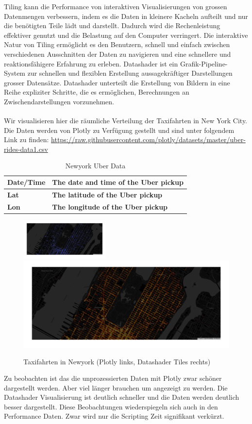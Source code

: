 \documentclass{article}
\begin{document}
Tiling kann die Performance von interaktiven Visualisierungen von grossen Datenmengen verbessern, 
indem es die Daten in kleinere Kacheln aufteilt und nur die benötigten Teile lädt und darstellt. 
Dadurch wird die Rechenleistung effektiver genutzt und die Belastung auf den Computer verringert. 
Die interaktive Natur von Tiling ermöglicht es den Benutzern, schnell und einfach zwischen verschiedenen Ausschnitten der Daten zu navigieren und eine schnellere und reaktionsfähigere Erfahrung zu erleben.\cite{noauthor_map_nodate}
Datashader ist ein Grafik-Pipeline-System zur schnellen und flexiblen Erstellung aussagekräftiger Darstellungen grosser Datensätze. Datashader unterteilt die Erstellung von Bildern in eine Reihe expliziter Schritte, die es ermöglichen, Berechnungen an Zwischendarstellungen vorzunehmen.\cite{wong_abstract_2013}
\\
\\
Wir visualisieren hier die räumliche Verteilung der Taxifahrten in New York City. 
Die Daten werden von Plotly zu Verfügung gestellt und sind unter folgendem Link zu finden: \url{https://raw.githubusercontent.com/plotly/datasets/master/uber-rides-data1.csv}

\begin{table}[!h]
\centering
\begin{tabular}{|l|l|}
\hline
\textbf{Date/Time} & \textbf{The date and time of the Uber pickup} \\
\hline
\textbf{Lat} & \textbf{The latitude of the Uber pickup} \\
\hline
\textbf{Lon} & \textbf{The longitude of the Uber pickup} \\
\hline
\end{tabular}
\caption{\label{tab: LE1 Newyork Taxi Data} Newyork Uber Data}
\end{table}



\begin{figure}[!h]
\centering
\includegraphics[width=0.4\textwidth]{img/newyork_plotly.png}
\includegraphics[height=0.18\textwidth]{img/newyork_datashader.png}
\caption{\label{fig: LE1 Plotly vs Datashader} Taxifahrten in Newyork (Plotly links, Datashader Tiles rechts)}
\end{figure}
\noindent
Zu beobachten ist das die unprozessierten Daten mit Plotly zwar schöner dargestellt werden. Aber viel länger brauchen um angezeigt zu werden. Die Datashader Visualisierung ist deutlich schneller und die Daten werden deutlich besser dargestellt.
Diese Beobachtungen wiederspiegeln sich auch in den Performance Daten. Zwar wird nur die Scripting Zeit signifikant verkürzt.
\end{document}
